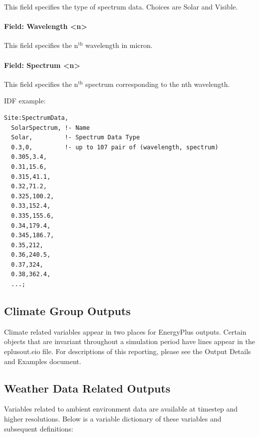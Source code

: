 This field specifies the type of spectrum data. Choices are Solar and Visible.

\paragraph{Field: Wavelength \textless{}n\textgreater{}}\label{field-wavelength-n}

This field specifies the n$^\textrm{th}$ wavelength in micron.

\paragraph{Field: Spectrum \textless{}n\textgreater{}}\label{field-spectrum-n}

This field specifies the n$^\textrm{th}$ spectrum corresponding to the nth wavelength.

IDF example:

\begin{lstlisting}
Site:SpectrumData,
  SolarSpectrum, !- Name
  Solar,         !- Spectrum Data Type
  0.3,0,         !- up to 107 pair of (wavelength, spectrum)
  0.305,3.4,
  0.31,15.6,
  0.315,41.1,
  0.32,71.2,
  0.325,100.2,
  0.33,152.4,
  0.335,155.6,
  0.34,179.4,
  0.345,186.7,
  0.35,212,
  0.36,240.5,
  0.37,324,
  0.38,362.4,
  ...;
\end{lstlisting}

\subsection{Climate Group Outputs}\label{outputs-3-011}

Climate related variables appear in two places for EnergyPlus outputs. Certain objects that are invariant throughout a simulation period have lines appear in the eplusout.eio file. For descriptions of this reporting, please see the Output Details and Examples document.

\subsection{Weather Data Related Outputs}\label{outputs-4-008}

Variables related to ambient environment data are available at timestep and higher resolutions. Below is a variable dictionary of these variables and subsequent definitions:

